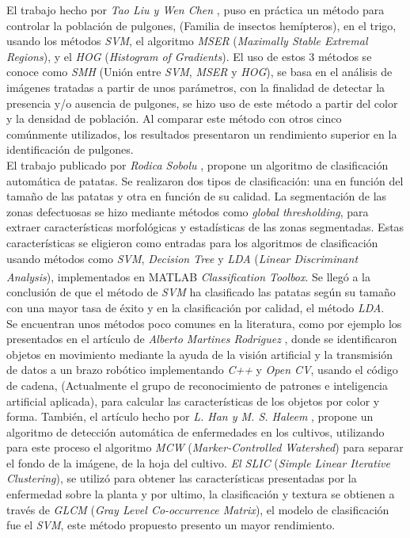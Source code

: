 El trabajo hecho por \textit{Tao Liu y Wen Chen} \cite{LIU201682}, puso en práctica un método para controlar la población de pulgones, (Familia de insectos hemípteros), en el trigo, usando los métodos \textit{SVM}, el algoritmo \textit{MSER} (\textit{Maximally Stable Extremal Regions}), y el \textit{HOG} (\textit{Histogram of Gradients}). El uso de estos 3 métodos se conoce como \textit{SMH} (Unión entre \textit{SVM}, \textit{MSER} y \textit{HOG}), se basa en el análisis de imágenes tratadas a partir de unos parámetros, con la finalidad de detectar la presencia y/o ausencia de pulgones, se hizo uso de este método a partir del color y la densidad de población. Al comparar este método con otros cinco comúnmente utilizados, los resultados presentaron un rendimiento superior en la identificación de pulgones. \\

El trabajo publicado por \textit{Rodica Sobolu} \cite{sobolu2020automatic}, propone un algoritmo de clasificación automática de patatas. Se realizaron dos tipos de clasificación: una en función del tamaño de las patatas y otra en función de su calidad. La segmentación de las zonas defectuosas se hizo mediante métodos como \textit{global thresholding}, para extraer características morfológicas y estadísticas de las zonas segmentadas. Estas características se eligieron como entradas para los algoritmos de clasificación usando métodos como \textit{SVM}, \textit{Decision  Tree} y \textit{LDA} (\textit{Linear Discriminant Analysis}), implementados en MATLAB\textsuperscript{\textregistered} \textit{Classification Toolbox}. Se llegó a la conclusión de que el método de \textit{SVM} ha clasificado las patatas según su tamaño con una mayor tasa de éxito y en la clasificación por calidad, el método \textit{LDA}.\\

Se encuentran unos métodos poco comunes en la literatura, como por ejemplo los presentados en el artículo de \textit{Alberto Martines Rodriguez} \cite{article5}, donde se identificaron objetos en movimiento mediante la ayuda de la visión artificial y la transmisión de datos a un brazo robótico implementando \textit{C++} y \textit{Open CV}, usando el código de cadena, (Actualmente el grupo de reconocimiento de patrones e inteligencia artificial aplicada), para calcular las características de los objetos por color y forma. También, el artículo hecho por \textit{L. Han y M. S. Haleem} \cite{7237209}, propone un algoritmo de detección automática de enfermedades en los cultivos, utilizando para este proceso el algoritmo \textit{MCW} (\textit{Marker-Controlled Watershed}) para separar el fondo de la imágene, de la hoja del cultivo. \textit{El SLIC} (\textit{Simple Linear Iterative Clustering}), se utilizó para obtener las características presentadas por la enfermedad sobre la planta y por ultimo, la clasificación y textura se obtienen a través de \textit{GLCM} (\textit{Gray Level Co-occurrence Matrix}), el modelo de clasificación fue el \textit{SVM}, este método propuesto presento un mayor rendimiento.\\

